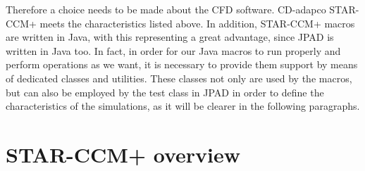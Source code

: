 \bigskip
\noindent
Therefore a choice needs to be made about the \gls{CFD} software. CD-adapco STAR-CCM+ meets the characteristics listed above. In addition, STAR-CCM+ macros are written in Java, with this representing a great advantage, since \gls{JPAD} is written in Java too. In fact, in order for our Java macros to run properly and perform operations as we want, it is necessary to provide them support by means of dedicated classes and utilities. These classes not only are used by the macros, but can also be employed by the test class in \gls{JPAD} in order to define the characteristics of the simulations, as it will be clearer in the following paragraphs. 

\section{STAR-CCM+ overview}
\label{sec4.2}

